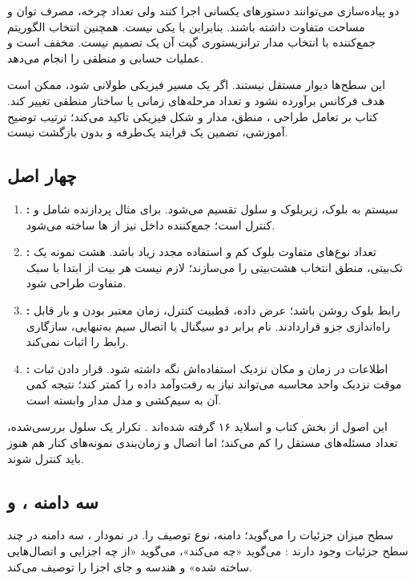 دو پیاده‌سازی می‌توانند دستورهای یکسانی اجرا کنند ولی تعداد چرخه، مصرف توان
و مساحت متفاوت داشته باشند. بنابراین  با
 یکی نیست. همچنین انتخاب الگوریتم جمع‌کننده با انتخاب
مدار ترانزیستوری گیت آن یک تصمیم نیست.
 مخفف  است و عملیات حسابی و منطقی را انجام می‌دهد.

این سطح‌ها دیوار مستقل نیستند. اگر یک مسیر فیزیکی طولانی شود، ممکن است
هدف فرکانس برآورده نشود و تعداد مرحله‌های زمانی یا ساختار منطقی تغییر کند.
کتاب بر تعامل طراحی ، منطق، مدار و شکل فیزیکی تاکید می‌کند؛
ترتیب توضیح آموزشی، تضمین یک فرایند یک‌طرفه و بدون بازگشت نیست.

\subsection{چهار اصل }
\begin{enumerate}
\item \textbf{:} سیستم به بلوک، زیر‌بلوک و سلول تقسیم می‌شود.
برای مثال پردازنده شامل  و کنترل است؛ جمع‌کننده داخل 
نیز از ها ساخته می‌شود.
\item \textbf{:} تعداد نوع‌های متفاوت بلوک کم و استفاده مجدد زیاد باشد.
هشت نمونه یک  تک‌بیتی، منطق انتخاب هشت‌بیتی را می‌سازند؛
لازم نیست هر بیت از ابتدا با سبک متفاوت طراحی شود.
\item \textbf{:} رابط بلوک روشن باشد؛ عرض داده، قطبیت کنترل،
زمان معتبر بودن و بار قابل راه‌اندازی جزو قراردادند.
نام برابر دو سیگنال یا اتصال سیم به‌تنهایی، سازگاری رابط را اثبات نمی‌کند.
\item \textbf{:} اطلاعات در زمان و مکان نزدیک استفاده‌اش نگه داشته شود.
قرار دادن ثبات موقت نزدیک واحد محاسبه می‌تواند نیاز به رفت‌وآمد داده را کمتر کند؛
نتیجه کمی آن به سیم‌کشی و مدل مدار وابسته است.
\end{enumerate}
این اصول از بخش  کتاب و اسلاید ۱۶ گرفته شده‌اند
\cite{weste,intro}. تکرار یک سلول بررسی‌شده، تعداد مسئله‌های مستقل را کم می‌کند؛
اما اتصال و زمان‌بندی نمونه‌های کنار هم هنوز باید کنترل شوند.

\subsection{سه دامنه ،  و }
سطح  میزان جزئیات را می‌گوید؛ دامنه، نوع توصیف را.
در نمودار ، سه دامنه در چند سطح جزئیات وجود دارند
\cite[بخش  و شکل ]{weste}:
 می‌گوید «چه می‌کند»،  می‌گوید «از چه اجزایی و اتصال‌هایی ساخته شده»
و  هندسه و جای اجزا را توصیف می‌کند.

